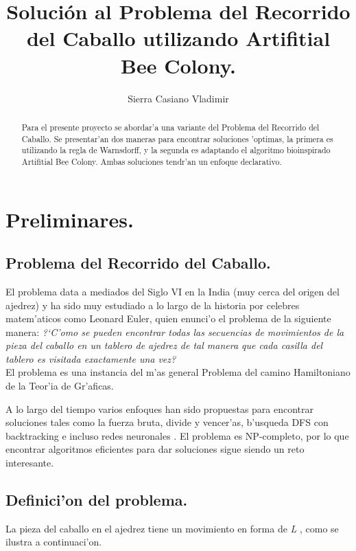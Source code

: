 \documentclass[12pt]{article}
\title{Solución al Problema del Recorrido del Caballo
    utilizando Artifitial Bee Colony.}
\author{Sierra Casiano Vladimir}
\begin{document}
    \maketitle

    \begin{abstract}
        Para el presente proyecto se abordar'a una variante del Problema del Recorrido del
        Caballo.
        Se presentar'an dos maneras para encontrar soluciones
        'optimas, la primera es utilizando la regla de Warnsdorff, y la segunda
        es adaptando el algoritmo bioinspirado Artifitial Bee Colony. Ambas
        soluciones tendr'an un enfoque declarativo.
    \end{abstract}


    \section{Preliminares.}

    \subsection{Problema del Recorrido del Caballo.}


    El problema data a mediados del Siglo VI en la India \cite{watkins} (muy cerca del
    origen del ajedrez) y ha sido muy estudiado a lo largo de la historia por
    celebres matem'aticos como
    Leonard Euler, quien enunci'o el problema de la siguiente manera:
    \textit{ ?`C'omo se pueden encontrar todas las secuencias de movimientos de
    la pieza del caballo en un tablero de ajedrez de tal manera que cada casilla del
    tablero es visitada exactamente una vez?
    }  \cite{golumbic2021} \\
    El problema es una instancia del m'as general
    Problema del camino Hamiltoniano de la  Teor'ia de Gr'aficas.

    A lo largo del tiempo varios enfoques han sido propuestas para
    encontrar soluciones tales como la fuerza bruta, divide y vencer'as,
    b'usqueda DFS con backtracking e incluso redes neuronales \cite{anan}.
    El problema es NP-completo, por lo que encontrar algoritmos eficientes
    para dar soluciones sigue siendo un reto interesante.



    \subsection{Definici'on del problema.}
    La pieza del caballo en el ajedrez tiene un movimiento en forma de \textit{L} , como
    se ilustra a continuaci'on.
    
\end{document}
